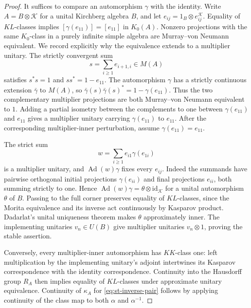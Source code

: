 \begin{proof}
It suffices to compare an automorphism $\gamma$ with the identity. Write $A=B\otimes\mathcal{K}$ for a unital Kirchberg algebra $B$, and let $e_{ij}=1_B\otimes e_{ij}^{\mathcal{K}}$. Equality of $KL$-classes implies $[\gamma(e_{11})]=[e_{11}]$ in $K_0(A)$. Nonzero projections with the same $K_0$-class in a purely infinite simple algebra are Murray--von Neumann
equivalent. We record explicitly why the equivalence extends to a multiplier
unitary. The strictly convergent sum 
\begin{equation*}
s=\sum_{i\geq1}e_{i+1,i}\in M(A) 
\end{equation*}
satisfies $s^*s=1$ and $ss^*=1-e_{11}$. The automorphism $\gamma$ has a
strictly continuous extension $\bar\gamma$ to $M(A)$, so $\bar\gamma(s)\bar\gamma(s)^*=1-\gamma(e_{11})$. Thus the two complementary
multiplier projections are both Murray--von Neumann equivalent to $1$.
Adding a partial isometry between the complements to one between $\gamma(e_{11})$ and $e_{11}$ gives a multiplier unitary carrying $\gamma(e_{11})$ to $e_{11}$. After the corresponding multiplier-inner
perturbation, assume $\gamma(e_{11})=e_{11}$.

The strict sum 
\begin{equation*}
w=\sum_{i\geq1}e_{i1}\gamma(e_{1i}) 
\end{equation*}
is a multiplier unitary, and $\operatorname{Ad}(w)\gamma$ fixes every $e_{ij}$. Indeed the
summands have pairwise orthogonal initial projections $\gamma(e_{ii})$ and
final projections $e_{ii}$, both summing strictly to one. Hence $\operatorname{Ad} (w)\gamma=\theta\otimes\mathrm{id}_{\mathcal{K}}$ for a unital automorphism $\theta$ of $B$. Passing to the full corner preserves equality of $KL$-classes, since the Morita equivalence and its inverse act continuously by
Kasparov product. Dadarlat's unital uniqueness theorem makes $\theta$
approximately inner. The implementing unitaries $v_n\in U(B)$ give
multiplier unitaries $v_n\otimes1$, proving the stable assertion.

Conversely, every multiplier-inner automorphism has $KK$-class one: left
multiplication by the implementing unitary's adjoint intertwines its
Kasparov correspondence with the identity correspondence. Continuity into
the Hausdorff group $R_A$ then implies equality of $KL$-classes under
approximate unitary equivalence. Continuity of $\kappa_A$ for \eqref{eq:st-inverse-pair} follows by applying continuity of the class map to
both $\alpha$ and $\alpha^{-1}$.
\end{proof}

